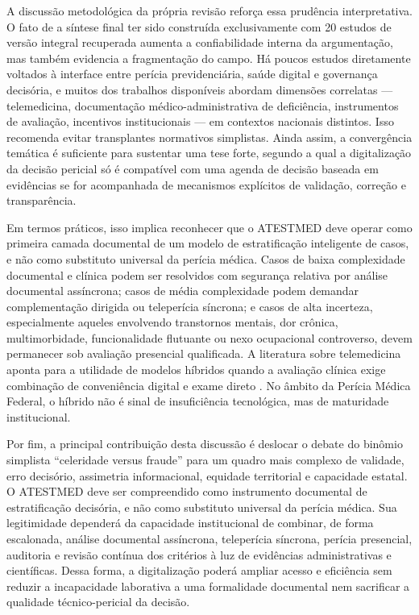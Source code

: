 \documentclass[12pt,a4paper]{article}
\begin{document}
A discussão metodológica da própria revisão reforça essa prudência interpretativa. O fato de a síntese final ter sido construída exclusivamente com 20 estudos de versão integral recuperada aumenta a confiabilidade interna da argumentação, mas também evidencia a fragmentação do campo. Há poucos estudos diretamente voltados à interface entre perícia previdenciária, saúde digital e governança decisória, e muitos dos trabalhos disponíveis abordam dimensões correlatas — telemedicina, documentação médico-administrativa de deficiência, instrumentos de avaliação, incentivos institucionais — em contextos nacionais distintos. Isso recomenda evitar transplantes normativos simplistas. Ainda assim, a convergência temática é suficiente para sustentar uma tese forte, segundo a qual a digitalização da decisão pericial só é compatível com uma agenda de decisão baseada em evidências se for acompanhada de mecanismos explícitos de validação, correção e transparência.

Em termos práticos, isso implica reconhecer que o ATESTMED deve operar como primeira camada documental de um modelo de estratificação inteligente de casos, e não como substituto universal da perícia médica. Casos de baixa complexidade documental e clínica podem ser resolvidos com segurança relativa por análise documental assíncrona; casos de média complexidade podem demandar complementação dirigida ou teleperícia síncrona; e casos de alta incerteza, especialmente aqueles envolvendo transtornos mentais, dor crônica, multimorbidade, funcionalidade flutuante ou nexo ocupacional controverso, devem permanecer sob avaliação presencial qualificada. A literatura sobre telemedicina aponta para a utilidade de modelos híbridos quando a avaliação clínica exige combinação de conveniência digital e exame direto \parencite{ftouni2022challengesoftelemedicineduringthecovid19pandemica}. No âmbito da Perícia Médica Federal, o híbrido não é sinal de insuficiência tecnológica, mas de maturidade institucional.

Por fim, a principal contribuição desta discussão é deslocar o debate do binômio simplista “celeridade versus fraude” para um quadro mais complexo de validade, erro decisório, assimetria informacional, equidade territorial e capacidade estatal. O ATESTMED deve ser compreendido como instrumento documental de estratificação decisória, e não como substituto universal da perícia médica. Sua legitimidade dependerá da capacidade institucional de combinar, de forma escalonada, análise documental assíncrona, teleperícia síncrona, perícia presencial, auditoria e revisão contínua dos critérios à luz de evidências administrativas e científicas. Dessa forma, a digitalização poderá ampliar acesso e eficiência sem reduzir a incapacidade laborativa a uma formalidade documental nem sacrificar a qualidade técnico-pericial da decisão.
\end{document}
